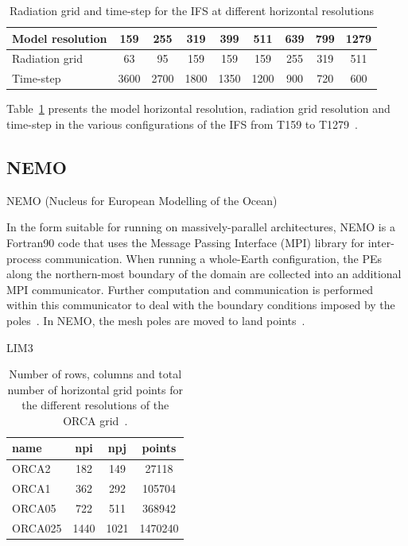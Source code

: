 \begin{table}[h!]
\centering       
\begin{tabular}{|l|c|c|c|c|c|c|c|c|}
    \hline 
    Model resolution & 159 & 255 & 319 & 399 & 511 & 639 & 799 & 1279 \\
    \hline
    Radiation grid & 63 & 95 & 159 & 159 & 159 & 255 & 319 & 511 \\
    Time-step & 3600 & 2700 & 1800 & 1350 & 1200 & 900 & 720 & 600 \\
    \hline
\end{tabular} 
\caption{Radiation grid and time-step for the IFS at different horizontal resolutions} 
\label{tab:ifs-grid}
\end{table}
Table~\ref{tab:ifs-grid} presents the model horizontal resolution, radiation grid resolution and time-step in the various configurations of the IFS from T159 to T1279~\cite{1399454274743}.



\subsection{NEMO}

NEMO (Nucleus for European Modelling of the Ocean)~\cite{nemo-book36}

In the form suitable for running on massively-parallel architectures, NEMO is a Fortran90 code that uses the Message Passing Interface (MPI) library for inter-process
communication. When running a whole-Earth configuration, the PEs along the northern-most boundary of the domain are collected into an additional MPI communicator. Further
computation and communication is performed within this communicator to deal with the boundary conditions imposed by the poles~\cite{nemo-report}. In NEMO, the mesh poles are moved to land points~\cite{ref1}.

LIM3~\cite{lim36,gmd-8-2991-2015}



\begin{table}[h!]
\centering
\begin{tabular}{|l|c|c|c|}
    \hline 
    name    & npi  & npj  & points  \\
    \hline   
    ORCA2   & 182  & 149  & 27118   \\
    ORCA1   & 362  & 292  & 105704  \\
    ORCA05  & 722  & 511  & 368942  \\
    ORCA025 & 1440 & 1021 & 1470240 \\
    \hline
\end{tabular}
\caption{Number of rows, columns and total number of horizontal grid points for the different resolutions of the ORCA grid~\cite{oriol14}.}
\label{tab:nemo-grid}
\end{table}

